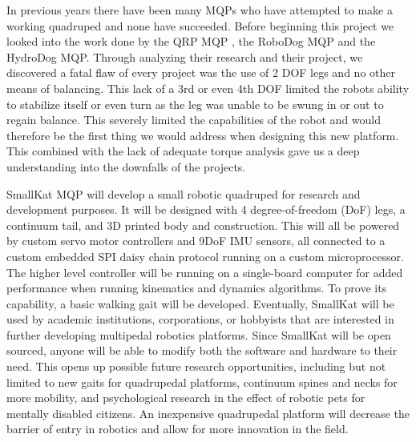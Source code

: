 In previous years there have been many MQPs who have attempted to make a working quadruped and none have succeeded. Before beginning this project we looked into the work done by the QRP MQP , the RoboDog MQP and the HydroDog MQP. Through analyzing their research and their project, we discovered a fatal flaw of every project was the use of 2 DOF legs and no other means of balancing. This lack of a 3rd or even 4th DOF limited the robots ability to stabilize itself or even turn as the leg was unable to be swung in or out to regain balance. This severely limited the capabilities of the robot and would therefore be the first thing we would address when designing this new platform.  This combined with the lack of adequate torque analysis gave us a deep understanding into the downfalls of the projects. 
 



SmallKat MQP will develop a small robotic quadruped for research and development purposes. It will be designed with 4 degree-of-freedom (DoF) legs, a continuum tail, and 3D printed body and construction. This will all be powered by custom servo motor controllers and 9DoF IMU sensors, all connected to a custom embedded SPI daisy chain protocol running on a custom microprocessor. The higher level controller will be running on a single-board computer for added performance when running kinematics and dynamics algorithms. To prove its capability, a basic walking gait will be developed. Eventually, SmallKat will be used by academic institutions, corporations, or hobbyists that are interested in further developing multipedal robotics platforms. Since SmallKat will be open sourced, anyone will be able to modify both the software and hardware to their need. This opens up possible future research opportunities, including but not limited to new gaits for quadrupedal platforms, continuum spines and necks for more mobility, and psychological research in the effect of robotic pets for mentally disabled citizens. An inexpensive quadrupedal platform will decrease the barrier of entry in robotics and allow for more innovation in the field.

